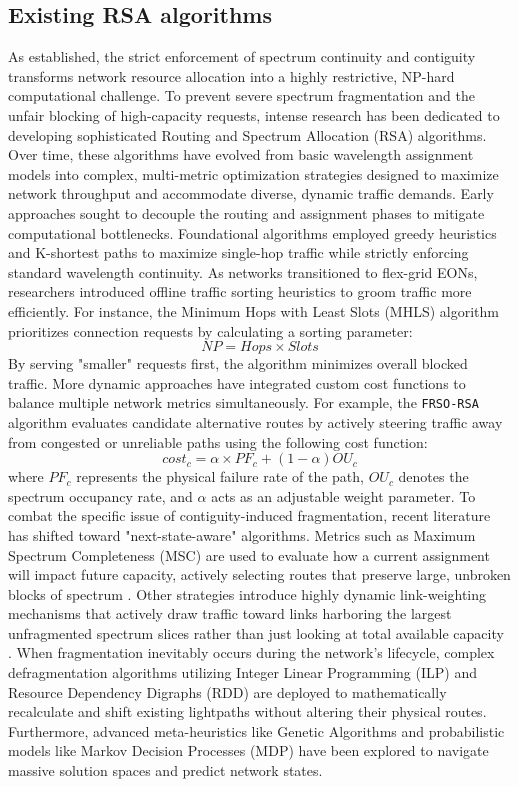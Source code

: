 \subsection{Existing RSA algorithms}
As established, the strict enforcement of spectrum continuity and contiguity transforms network resource allocation into a highly restrictive, NP-hard computational challenge\cite{rsaHeuristicSliced}. To prevent severe spectrum fragmentation and the unfair blocking of high-capacity requests, intense research has been dedicated to developing sophisticated Routing and Spectrum Allocation (RSA) algorithms\cite{distanceAdaptive}. Over time, these algorithms have evolved from basic wavelength assignment models into complex, multi-metric optimization strategies designed to maximize network throughput and accommodate diverse, dynamic traffic demands\cite{algorithmsRSATaxonomy}. Early approaches sought to decouple the routing and assignment phases to mitigate computational bottlenecks. Foundational algorithms employed greedy heuristics and K-shortest paths to maximize single-hop traffic while strictly enforcing standard wavelength continuity\cite{heuristicWSAMultihop}. As networks transitioned to flex-grid EONs, researchers introduced offline traffic sorting heuristics to groom traffic more efficiently. For instance, the Minimum Hops with Least Slots (MHLS) algorithm prioritizes connection requests by calculating a sorting parameter\cite{rsaHeuristicSliced}:
\[
    NP=Hops \times Slots
\]
By serving "smaller" requests first, the algorithm minimizes overall blocked traffic\cite{rsaHeuristicSliced}. More dynamic approaches have integrated custom cost functions to balance multiple network metrics simultaneously. For example, the \texttt{FRSO-RSA} algorithm evaluates candidate alternative routes by actively steering traffic away from congested or unreliable paths using the following cost function\cite{failureProbability}:
\[
    cost_c = \alpha \times PF_c + (1 - \alpha) OU_c
\]
where $PF_c$ represents the physical failure rate of the path, $OU_c$ denotes the spectrum occupancy rate, and $\alpha$ acts as an adjustable weight parameter\cite{failureProbability}.
To combat the specific issue of contiguity-induced fragmentation, recent literature has shifted toward "next-state-aware" algorithms. Metrics such as Maximum Spectrum Completeness (MSC) are used to evaluate how a current assignment will impact future capacity, actively selecting routes that preserve large, unbroken blocks of spectrum \cite{maximumSpectrumCompleteness}. Other strategies introduce highly dynamic link-weighting mechanisms that actively draw traffic toward links harboring the largest unfragmented spectrum slices rather than just looking at total available capacity \cite{spectrumStatusAware}. When fragmentation inevitably occurs during the network's lifecycle, complex defragmentation algorithms utilizing Integer Linear Programming (ILP) and Resource Dependency Digraphs (RDD) are deployed to mathematically recalculate and shift existing lightpaths without altering their physical routes\cite{optimizingSpectrumAllocationEON}. Furthermore, advanced meta-heuristics like Genetic Algorithms and probabilistic models like Markov Decision Processes (MDP) have been explored to navigate massive solution spaces and predict network states\cite{routingModulation,adaptiveRSAFlex}.
